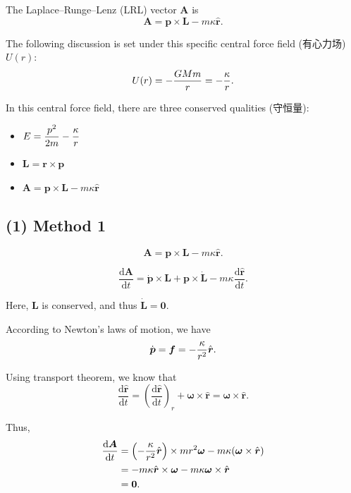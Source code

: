 The Laplace--Runge--Lenz (LRL) vector \(\boldsymbol A\) is
\[\boldsymbol A = \boldsymbol p \times \boldsymbol L - m \kappa \hat {\boldsymbol r}.\]

The following discussion is set under this specific central force field
(有心力场) \(U(r)\): \[U(r) = - {GMm \over r} = - {\kappa \over r}.\]

In this central force field, there are three conserved qualities
(守恒量):

\begin{itemize}
\tightlist{}
\item
  \(\displaystyle E = {p^2 \over 2m} - {\kappa \over r}\)
\item 
  \(\displaystyle \boldsymbol L = \boldsymbol r \times \boldsymbol p\)
\item
  \(\displaystyle \boldsymbol A = \boldsymbol p \times \boldsymbol L - m \kappa \hat {\boldsymbol r}\)
\end{itemize}

\subsection*{(1) Method 1}\label{method-1}

\[\boldsymbol A = \boldsymbol p \times \boldsymbol L - m \kappa \hat {\boldsymbol r}.\]

\[\dfrac{\mathrm d \boldsymbol A}{\mathrm dt} = \dot {\boldsymbol p} \times \boldsymbol L + \boldsymbol p \times \dot {\boldsymbol L} - m \kappa \dfrac{\mathrm d \hat {\boldsymbol r}}{\mathrm dt}.\]

Here, \(\boldsymbol L\) is conserved, and thus
\(\dot {\boldsymbol L} = \boldsymbol 0.\)

According to Newton's laws of motion, we have
\[\dot {\boldsymbol p} = \boldsymbol f = - {\kappa \over r^2} \hat {\boldsymbol r}.\]

Using transport theorem, we know that
\[\dfrac{\mathrm d \hat {\boldsymbol r}}{\mathrm dt} = \left( \dfrac{\mathrm d \hat {\boldsymbol r}}{\mathrm dt} \right)_r + \boldsymbol \omega \times \hat {\boldsymbol r} = \boldsymbol \omega \times \hat {\boldsymbol r}.\]

Thus, \begin{align*}
    \dfrac{\mathrm d \boldsymbol A}{\mathrm dt} & = \left(- {\kappa \over r^2} \hat {\boldsymbol r} \right) \times m r^2 \boldsymbol \omega - m \kappa (\boldsymbol \omega \times \hat {\boldsymbol r}) \\
    & = - m \kappa \hat {\boldsymbol r} \times\boldsymbol \omega - m \kappa \boldsymbol \omega \times \hat {\boldsymbol r} \\
    & = \boldsymbol 0.
\end{align*}

